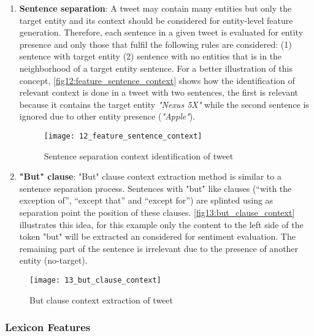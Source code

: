\begin{enumerate}
\itemsep0em 

\item \textbf{Sentence separation}: A tweet may contain many entities but only the target entity and its context should be considered for entity-level feature generation. Therefore, each sentence in a given tweet is evaluated for entity presence and only those that fulfil the following rules are considered: (1) sentence with target entity (2) sentence with no entities that is in the neighborhood of a target entity sentence. For a better illustration of this concept,  \autoref{fig12:feature_sentence_context} shows how the identification of relevant context is done in a tweet with two sentences, the first is relevant because it contains the target entity \textit{"Nexus 5X"} while the second sentence is ignored due to other entity presence (\textit{"Apple"}).  

\begin{figure}[H]
    \centering
    \texttt{[image: 12\_feature\_sentence\_context]}
    \caption{Sentence separation context identification of tweet}
    \label{fig12:feature_sentence_context}
\end{figure}

\pagebreak

\item \textbf{"But" clause}: "But" clause context extraction method is similar to a sentence separation process. Sentences with "but" like clauses (“with the exception of”, “except that” and “except for”) are splinted using as separation point the position of these clauses. \autoref{fig13:but_clause_context} illustrates this idea, for this example only the content to the left side of the token "but" will be extracted an considered for sentiment evaluation. The remaining part of the sentence is irrelevant due to the presence of another entity (no-target).

\end{enumerate}

\begin{figure}[H]
    \centering
    \caption{But clause context extraction of tweet}
    \texttt{[image: 13\_but\_clause\_context]}
    \label{fig13:but_clause_context}
\end{figure}

\subsubsection{Lexicon Features}

